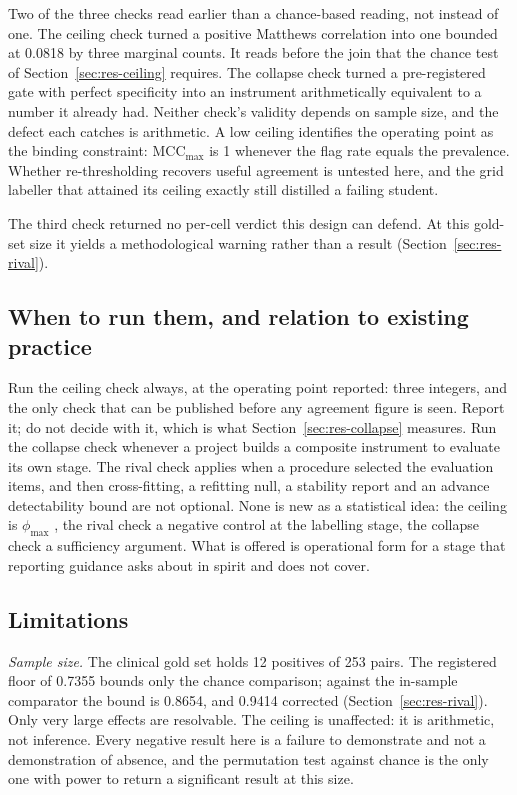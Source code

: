 \documentclass[review]{elsarticle}
\begin{document}
Two of the three checks read earlier than a chance-based reading, not instead
of one. The ceiling check turned a positive Matthews correlation into one bounded at 0.0818 by three marginal counts. It reads before the join that
the chance test of Section~\ref{sec:res-ceiling} requires. The collapse check turned a pre-registered gate with perfect
specificity into an instrument arithmetically equivalent to a number it already
had. Neither check's validity depends on sample size, and the defect each catches
is arithmetic. A low ceiling identifies the operating point as the binding
constraint: $\mathrm{MCC}_{\max}$ is 1 whenever the flag rate equals the
prevalence. Whether re-thresholding recovers useful agreement is untested here,
and the grid labeller that attained its ceiling exactly still distilled a
failing student.

The third check returned no per-cell verdict this design can defend. At this
gold-set size it yields a methodological warning rather than a result
(Section~\ref{sec:res-rival}).

\subsection{When to run them, and relation to existing practice}

Run the ceiling check always, at the operating point reported: three integers,
and the only check that can be published before any agreement figure is seen.
Report it; do not decide with it, which is what Section~\ref{sec:res-collapse}
measures. Run the collapse check whenever a project builds a
composite instrument to evaluate its own stage. The rival check applies when a
procedure selected the evaluation items, and then cross-fitting, a refitting
null, a stability report and an advance detectability bound are not optional.
None is new as a statistical idea: the ceiling is $\phi_{\max}$
\cite{cureton1959phimax,guilford1965phi}, the rival check a negative control
\cite{lipsitch2010negative,poliak2018hypothesis} at the labelling stage, the
collapse check a sufficiency argument. What is offered is operational form for a stage that reporting guidance asks
about in spirit \cite{collins2024tripodai} and does not cover.

\subsection{Limitations}
\label{sec:limitations}

\emph{Sample size.} The clinical gold set holds 12 positives of 253 pairs. The
registered floor of 0.7355 bounds only the chance comparison; against the
in-sample comparator the bound is 0.8654, and 0.9414 corrected
(Section~\ref{sec:res-rival}). Only very large effects are
resolvable. The ceiling is unaffected: it is arithmetic, not inference. Every negative result here is a failure to demonstrate and not a
demonstration of absence, and the permutation test against chance is the only one with power to return a
significant result at this size.
\end{document}
